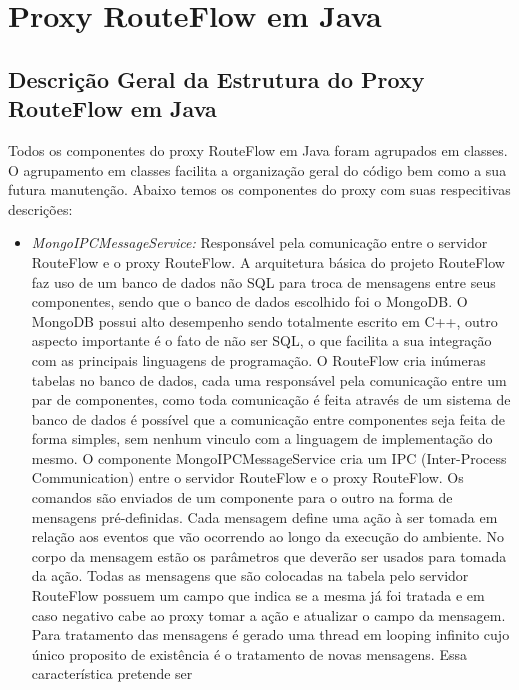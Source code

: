 \chapter{Proxy RouteFlow em Java}

\section{Descrição Geral da Estrutura do Proxy RouteFlow em Java}

Todos os componentes do proxy RouteFlow em Java foram agrupados em classes. O agrupamento em classes 
facilita a 
organização geral do código bem como a sua futura manutenção. Abaixo temos os componentes do proxy com 
suas respecitivas descrições:

\begin{itemize}
\item \textit{MongoIPCMessageService:} Responsável pela comunicação entre o servidor RouteFlow e o proxy 
RouteFlow. A arquitetura básica do projeto RouteFlow faz uso de um banco de dados não SQL para troca de 
mensagens entre seus componentes, sendo que o banco de dados escolhido foi o MongoDB. O MongoDB possui 
alto desempenho sendo totalmente escrito em C++, outro aspecto importante é o fato de não ser SQL, o 
que facilita a sua integração com as  principais linguagens de programação. 
O RouteFlow cria inúmeras tabelas no banco de dados, cada uma responsável pela comunicação entre um par 
de componentes, como toda comunicação é feita através de um sistema de banco de dados é possível que a 
comunicação entre componentes seja feita de forma simples, sem nenhum vinculo com a linguagem de 
implementação do mesmo. O componente MongoIPCMessageService cria um IPC (Inter-Process Communication) 
entre o servidor RouteFlow e o proxy RouteFlow. Os comandos são enviados de um componente para o outro 
na forma de mensagens pré-definidas. Cada mensagem define uma ação à ser tomada em relação aos eventos 
que vão ocorrendo ao longo da execução do ambiente. No corpo da mensagem estão os parâmetros que 
deverão ser usados para tomada da ação. Todas as mensagens que são colocadas na tabela pelo servidor RouteFlow 
possuem um campo que indica se a mesma já foi tratada e em caso negativo cabe ao proxy tomar a ação e 
atualizar o campo da mensagem. Para tratamento das mensagens é gerado uma thread em looping infinito 
cujo único proposito de existência é o tratamento de novas mensagens. Essa característica pretende ser 


\end{itemize}
